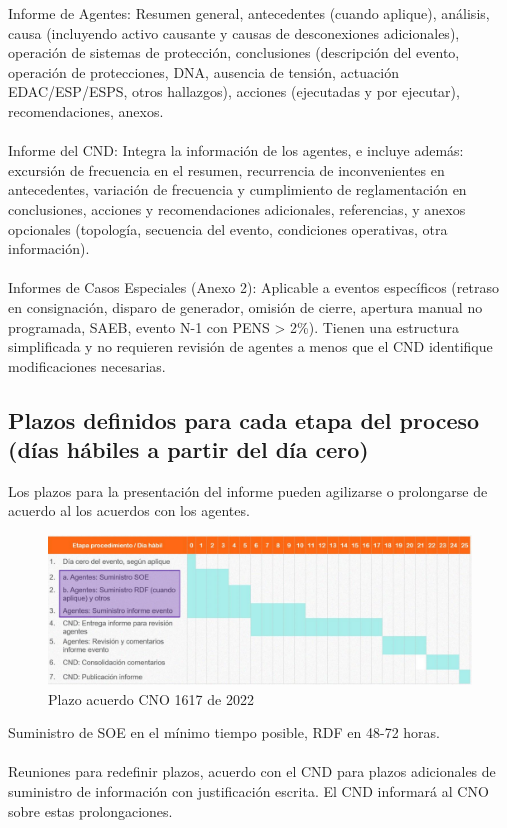 \documentclass[a5paper]{book}%
\begin{document}
Informe de Agentes: Resumen general, antecedentes (cuando aplique), análisis, causa (incluyendo activo causante y causas de desconexiones adicionales), operación de sistemas de protección, conclusiones (descripción del evento, operación de protecciones, DNA, ausencia de tensión, actuación EDAC/ESP/ESPS, otros hallazgos), acciones (ejecutadas y por ejecutar), recomendaciones, anexos.\\\\
Informe del CND: Integra la información de los agentes, e incluye además: excursión de frecuencia en el resumen, recurrencia de inconvenientes en antecedentes, variación de frecuencia y cumplimiento de reglamentación en conclusiones, acciones y recomendaciones adicionales, referencias, y anexos opcionales (topología, secuencia del evento, condiciones operativas, otra información).\\\\
Informes de Casos Especiales (Anexo 2): Aplicable a eventos específicos (retraso en consignación, disparo de generador, omisión de cierre, apertura manual no programada, SAEB, evento N-1 con PENS > 2\%). Tienen una estructura simplificada y no requieren revisión de agentes a menos que el CND identifique modificaciones necesarias.

\subsection{Plazos definidos para cada etapa del proceso (días hábiles a partir del día cero)}

Los plazos para la presentación del informe pueden agilizarse o prolongarse de acuerdo al los acuerdos con los agentes.

\begin{figure}[H]
	\caption{Plazo acuerdo CNO 1617 de 2022}
	\label{fig:plazo1617}
	\includegraphics[width=\linewidth]{plazo16172022}
\end{figure}

Suministro de SOE en el mínimo tiempo posible, RDF en 48-72 horas.\\\\
Reuniones para redefinir plazos, acuerdo con el CND para plazos adicionales de suministro de información con justificación escrita. El CND informará al CNO sobre estas prolongaciones.
\end{document}
